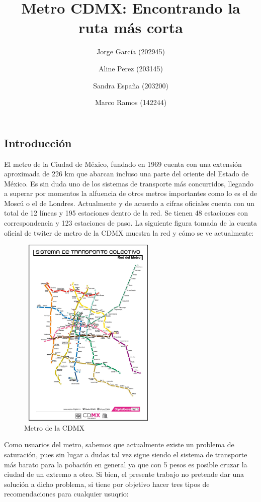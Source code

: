 \documentclass[
]{article}
\title{Metro CDMX: Encontrando la ruta más corta}
\author{Jorge García (202945) \and Aline Perez (203145) \and Sandra
España (203200) \and Marco Ramos (142244)}
\date{}
\begin{document}
\maketitle

\hypertarget{introducciuxf3n}{%
\subsection{Introducción}\label{introducciuxf3n}}

El metro de la Ciudad de México, fundado en 1969 cuenta con una
extensión aproximada de 226 km que abarcan incluso una parte del oriente
del Estado de México. Es sin duda uno de los sistemas de transporte más
concurridos, llegando a superar por momentos la alfuencia de otros
metros importantes como lo es el de Moscú o el de Londres. Actualmente y
de acuerdo a cifras oficiales cuenta con un total de 12 líneas y 195
estaciones dentro de la red. Se tienen 48 estaciones con correspondencia
y 123 estaciones de paso. La siguiente figura tomada de la cuenta
oficial de twiter de metro de la CDMX muestra la red y cómo se ve
actualmente:

\begin{figure}
\centering
\includegraphics[width=0.6\textwidth,height=3.64583in]{Imagenes/Red_metro_cdmx.png}
\caption{Metro de la CDMX}
\end{figure}

Como usuarios del metro, sabemos que actualmente existe un problema de
saturación, pues sin lugar a dudas tal vez sigue siendo el sistema de
transporte más barato para la pobación en general ya que con 5 pesos es
posible cruzar la ciudad de un extremo a otro. Si bien, el presente
trabajo no pretende dar una solución a dicho problema, si tiene por
objetivo hacer tres tipos de recomendaciones para cualquier usuqrio:
\end{document}
